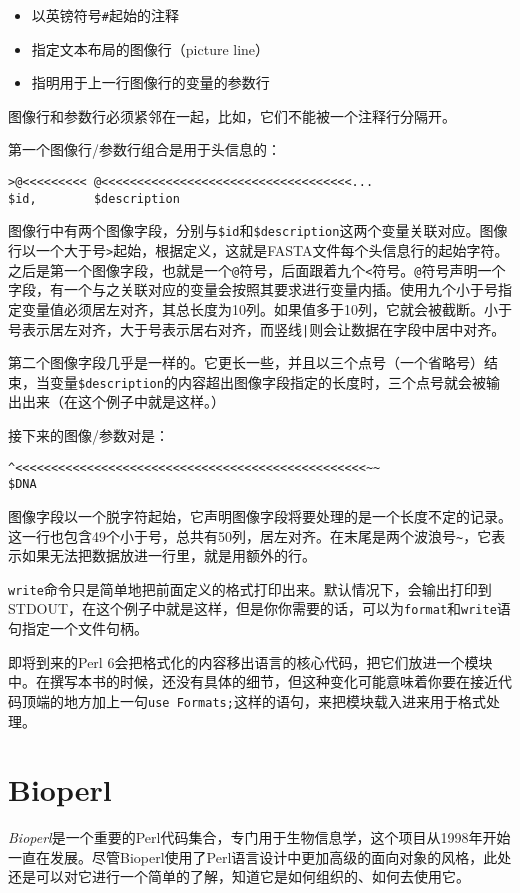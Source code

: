 \begin{itemize}
  \item 以英镑符号\verb|#|起始的注释
  \item 指定文本布局的图像行（picture line）
  \item 指明用于上一行图像行的变量的参数行
\end{itemize}

图像行和参数行必须紧邻在一起，比如，它们不能被一个注释行分隔开。

第一个图像行/参数行组合是用于头信息的：

\begin{lstlisting}
>@<<<<<<<<< @<<<<<<<<<<<<<<<<<<<<<<<<<<<<<<<<<<<...
$id,        $description
\end{lstlisting}

图像行中有两个图像字段，分别与\verb|$id|和\verb|$description|这两个变量关联对应。图像行以一个大于号\verb|>|起始，根据定义，这就是FASTA文件每个头信息行的起始字符。之后是第一个图像字段，也就是一个\verb|@|符号，后面跟着九个\verb|<|符号。\verb|@|符号声明一个字段，有一个与之关联对应的变量会按照其要求进行变量内插。使用九个小于号指定变量值必须居左对齐，其总长度为10列。如果值多于10列，它就会被截断。小于号表示居左对齐，大于号表示居右对齐，而竖线\verb=|=则会让数据在字段中居中对齐。

第二个图像字段几乎是一样的。它更长一些，并且以三个点号（一个省略号）结束，当变量\verb|$description|的内容超出图像字段指定的长度时，三个点号就会被输出出来（在这个例子中就是这样。）

接下来的图像/参数对是：

\begin{lstlisting}
^<<<<<<<<<<<<<<<<<<<<<<<<<<<<<<<<<<<<<<<<<<<<<<<<<~~
$DNA
\end{lstlisting}

图像字段以一个脱字符起始，它声明图像字段将要处理的是一个长度不定的记录。这一行也包含49个小于号，总共有50列，居左对齐。在末尾是两个波浪号\verb|~|，它表示如果无法把数据放进一行里，就是用额外的行。

\verb|write|命令只是简单地把前面定义的格式打印出来。默认情况下，会输出打印到STDOUT，在这个例子中就是这样，但是你你需要的话，可以为\verb|format|和\verb|write|语句指定一个文件句柄。

即将到来的Perl 6会把格式化的内容移出语言的核心代码，把它们放进一个模块中。在撰写本书的时候，还没有具体的细节，但这种变化可能意味着你要在接近代码顶端的地方加上一句\verb|use Formats;|这样的语句，来把模块载入进来用于格式处理。

\section{Bioperl}
\textit{Bioperl}是一个重要的Perl代码集合，专门用于生物信息学，这个项目从1998年开始一直在发展。尽管Bioperl使用了Perl语言设计中更加高级的面向对象的风格，此处还是可以对它进行一个简单的了解，知道它是如何组织的、如何去使用它。

